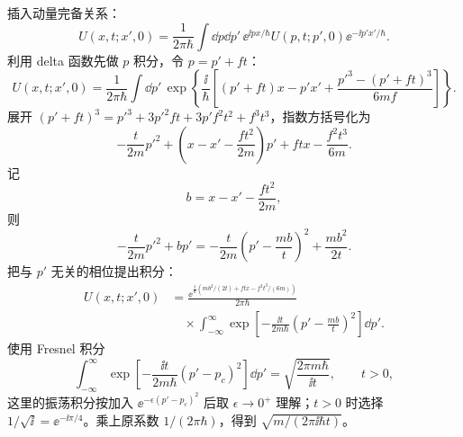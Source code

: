 \begin{checkedsolution}
插入动量完备关系：
\begin{equation}
  U(x,t;x',0)
  =\frac{1}{2\pi\hbar}
  \int\dd p\dd p'\,
  \ee^{\ii px/\hbar}
  U(p,t;p',0)
  \ee^{-\ii p'x'/\hbar}.
  \label{eq:QM-C05-S04-E03-fourier-start}
\end{equation}
利用 delta 函数先做 $p$ 积分，令 $p=p'+ft$：
\begin{equation}
  U(x,t;x',0)=\frac{1}{2\pi\hbar}\int\dd p'\,
  \exp\left\{\frac{\ii}{\hbar}
    \left[(p'+ft)x-p'x'
      +\frac{p'^3-(p'+ft)^3}{6mf}\right]\right\}.
\end{equation}
展开 $(p'+ft)^3=p'^3+3p'^2ft+3p'f^2t^2+f^3t^3$，指数方括号化为
\begin{equation}
  -\frac{t}{2m}p'^2
  +\left(x-x'-\frac{ft^2}{2m}\right)p'
  +ftx-\frac{f^2t^3}{6m}.
  \label{eq:QM-C05-S04-E03-quadratic-phase}
\end{equation}
记
\begin{equation}
  b=x-x'-\frac{ft^2}{2m},
\end{equation}
则
\begin{equation}
  -\frac{t}{2m}p'^2+bp'
  =-\frac{t}{2m}
    \left(p'-\frac{mb}{t}\right)^2
   +\frac{mb^2}{2t}.
  \label{eq:QM-C05-S04-E03-complete-square}
\end{equation}
把与 $p'$ 无关的相位提出积分：
\begin{align}
  U(x,t;x',0)
  &=\frac{\ee^{\frac{\ii}{\hbar}
       (mb^2/(2t)+ftx-f^2t^3/(6m))}}{2\pi\hbar}\\
  &\quad\times\int_{-\infty}^{\infty}
     \exp\left[-\frac{\ii t}{2m\hbar}
          \left(p'-\frac{mb}{t}\right)^2\right]\dd p'.
\end{align}
使用 Fresnel 积分
\begin{equation}
  \int_{-\infty}^{\infty}
  \exp\left[-\frac{\ii t}{2m\hbar}(p'-p_c)^2\right]\dd p'
  =\sqrt{\frac{2\pi m\hbar}{\ii t}},
  \qquad t>0,
\end{equation}
这里的振荡积分按加入 $\ee^{-\epsilon(p'-p_c)^2}$ 后取 $\epsilon\to0^+$ 理解；$t>0$ 时选择 $1/\sqrt{\ii}=\ee^{-\ii\pi/4}$。乘上原系数 $1/(2\pi\hbar)$，得到 $\sqrt{m/(2\pi\ii\hbar t)}$。


\end{checkedsolution}
